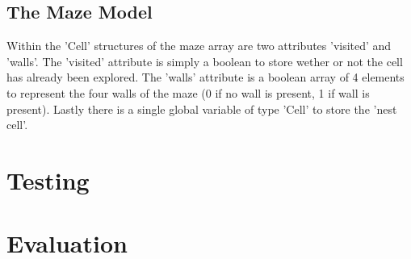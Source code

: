 \documentclass[a4paper]{article}
\begin{document}
	\subsection{The Maze Model}
	Within the 'Cell' structures of the maze array are two attributes 'visited' and 'walls'. The 'visited' attribute is simply a boolean to store wether or not the cell has already been explored. The 'walls' attribute is a boolean array of 4 elements to represent the four walls of the maze (0 if no wall is present, 1 if wall is present). Lastly there is a single global variable of type 'Cell' to store the 'nest cell'.
	
	\section{Testing}
	\section{Evaluation}
	
	
\end{document}
